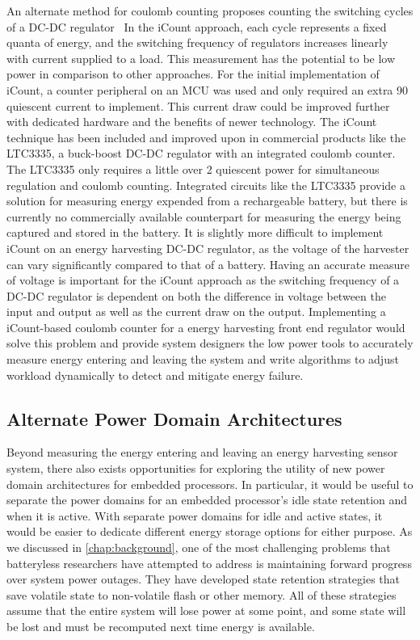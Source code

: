 An alternate method for coulomb counting proposes counting the switching cycles of a DC-DC regulator~\cite{duttaEnergy08} In the iCount approach, each cycle represents a fixed quanta of energy, and the switching frequency of regulators increases linearly with current supplied to a load.
This measurement has the potential to be low power in comparison to other approaches.
For the initial implementation of iCount, a counter peripheral on an MCU was used and only required an extra 90\ssi{\nano\ampere} quiescent current to implement. This current draw could be improved further with dedicated hardware and the benefits of newer technology.
The iCount technique has been included and improved upon in commercial products like the LTC3335, a buck-boost DC-DC regulator with an integrated coulomb counter. 
The LTC3335 only requires a little over 2\ssi{\micro\watt} quiescent power for simultaneous regulation and coulomb counting.
Integrated circuits like the LTC3335 provide a solution for measuring energy expended from a rechargeable battery, but there is currently no commercially available counterpart for measuring the energy being captured and stored in the battery.
It is slightly more difficult to implement iCount on an energy harvesting DC-DC regulator, as the voltage of the harvester can vary significantly compared to that of a battery.
Having an accurate measure of voltage is important for the iCount approach as the switching frequency of a DC-DC regulator is dependent on both the difference in voltage between the input and output as well as the current draw on the output.
Implementing a iCount-based coulomb counter for a 
energy harvesting front end regulator would solve this problem and provide system designers the low power tools to accurately measure energy entering and leaving the system and write algorithms to adjust workload dynamically to detect and mitigate energy failure. 

\subsection{Alternate Power Domain Architectures}
Beyond measuring the energy entering and leaving an energy harvesting sensor system, there also exists opportunities for exploring the utility of new power domain architectures for embedded processors.
In particular, it would be useful to separate the power domains for an embedded processor's idle state retention and when it is active.
With separate power domains for idle and active states, it would be easier to dedicate different energy storage options for either purpose.
As we discussed in \cref{chap:background}, one of the most challenging problems that batteryless researchers have attempted to address is maintaining forward progress over system power outages.
They have developed state retention strategies that save volatile state to non-volatile flash or other memory.
All of these strategies assume that the entire system will lose power at some point, and some state will be lost and must be recomputed next time energy is available.

